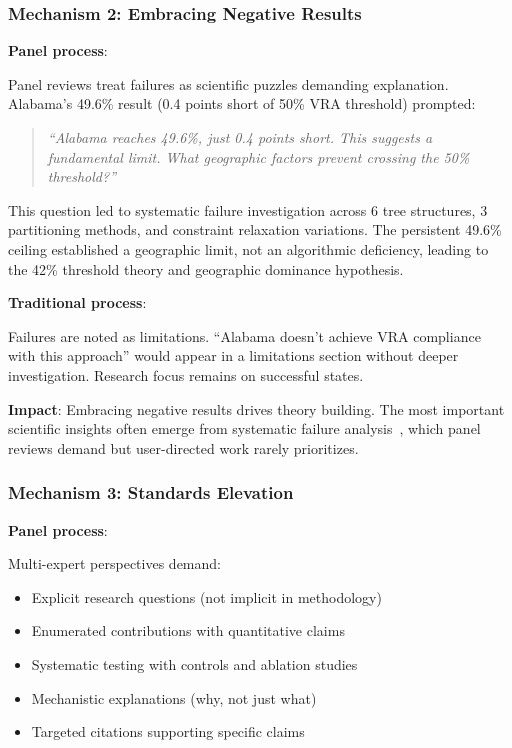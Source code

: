 \subsubsection{Mechanism 2: Embracing Negative Results}

\textbf{Panel process}:

Panel reviews treat failures as scientific puzzles demanding explanation. Alabama's 49.6\% result (0.4 points short of 50\% VRA threshold) prompted:

\begin{quote}
\textit{``Alabama reaches 49.6\%, just 0.4 points short. This suggests a fundamental limit. What geographic factors prevent crossing the 50\% threshold?''}
\end{quote}

This question led to systematic failure investigation across 6 tree structures, 3 partitioning methods, and constraint relaxation variations. The persistent 49.6\% ceiling established a geographic limit, not an algorithmic deficiency, leading to the 42\% threshold theory and geographic dominance hypothesis.

\textbf{Traditional process}:

Failures are noted as limitations. ``Alabama doesn't achieve VRA compliance with this approach'' would appear in a limitations section without deeper investigation. Research focus remains on successful states.

\textbf{Impact}: Embracing negative results drives theory building. The most important scientific insights often emerge from systematic failure analysis~\cite{firestein2015failure}, which panel reviews demand but user-directed work rarely prioritizes.

\subsubsection{Mechanism 3: Standards Elevation}

\textbf{Panel process}:

Multi-expert perspectives demand:
\begin{itemize}[leftmargin=*]
\item Explicit research questions (not implicit in methodology)
\item Enumerated contributions with quantitative claims
\item Systematic testing with controls and ablation studies
\item Mechanistic explanations (why, not just what)
\item Targeted citations supporting specific claims
\end{itemize}

